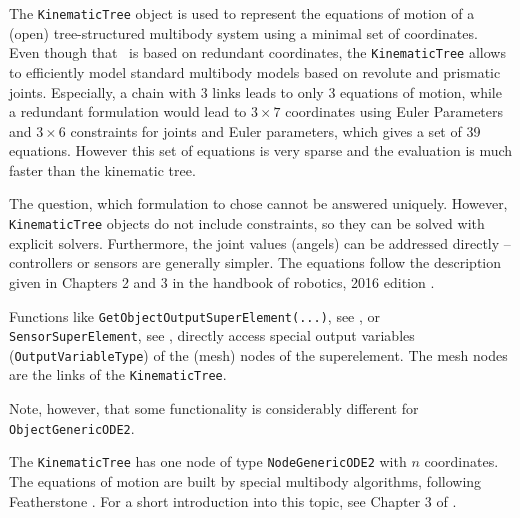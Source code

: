     \finishTable
    The \texttt{KinematicTree} object is used to represent the equations of motion of a (open) tree-structured multibody system
    using a minimal set of coordinates. Even though that \codeName\ is based on redundant coordinates,
    the \texttt{KinematicTree} allows to efficiently model standard multibody models based on revolute and prismatic joints.
    Especially, a chain with 3 links leads to only 3 equations of motion, while a redundant formulation would lead
    to $3 \times 7$ coordinates using Euler Parameters and $3 \times 6$ constraints for joints and Euler parameters,
    which gives a set of 39 equations. However this set of equations is very sparse and the evaluation is much faster
    than the kinematic tree.

    The question, which formulation to chose cannot be answered uniquely. However, \texttt{KinematicTree} objects
    do not include constraints, so they can be solved with explicit solvers. Furthermore, the joint values (angels)
    can be addressed directly -- controllers or sensors are generally simpler.
    The equations follow the description given in Chapters 2 and 3 in the handbook of robotics, 2016 edition \cite{Siciliano2016}.

    Functions like \texttt{GetObjectOutputSuperElement(...)}, see , 
    or \texttt{SensorSuperElement}, see , directly access special output variables
    (\texttt{OutputVariableType}) of the (mesh) nodes of the superelement. The mesh nodes are the links of the
    \texttt{KinematicTree}.
    
    Note, however, that some functionality is considerably different for \texttt{ObjectGenericODE2}.
    
    The \texttt{KinematicTree} has one node of type \texttt{NodeGenericODE2} with $n$ coordinates.
    The equations of motion are built by special multibody algorithms, following Featherstone \cite{Featherstone2008}. 
    For a short introduction into this topic, see Chapter 3 of \cite{Siciliano2016}. 
    

